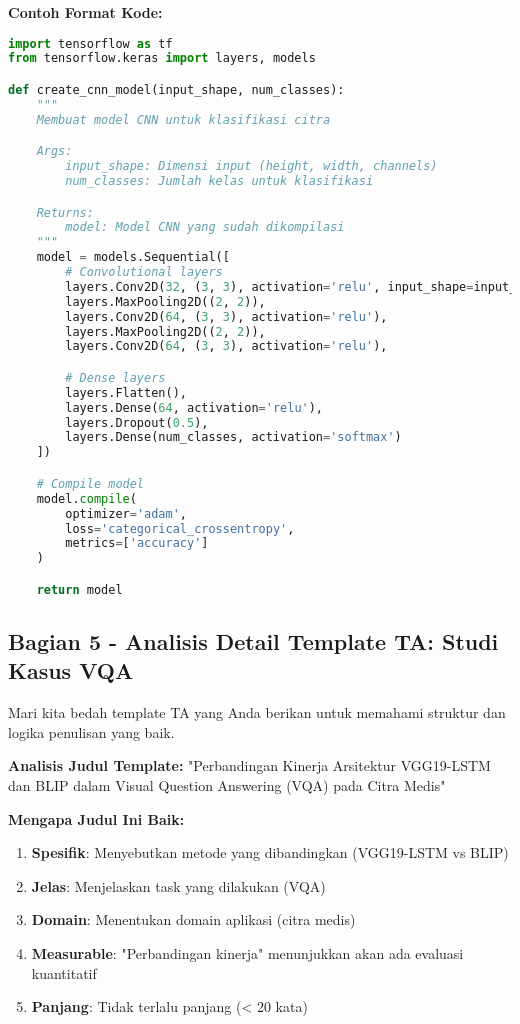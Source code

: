 \textbf{Contoh Format Kode:}
\begin{lstlisting}[language=python, style=python, caption=Implementasi Model CNN untuk Klasifikasi Citra]
import tensorflow as tf
from tensorflow.keras import layers, models

def create_cnn_model(input_shape, num_classes):
    """
    Membuat model CNN untuk klasifikasi citra

    Args:
        input_shape: Dimensi input (height, width, channels)
        num_classes: Jumlah kelas untuk klasifikasi

    Returns:
        model: Model CNN yang sudah dikompilasi
    """
    model = models.Sequential([
        # Convolutional layers
        layers.Conv2D(32, (3, 3), activation='relu', input_shape=input_shape),
        layers.MaxPooling2D((2, 2)),
        layers.Conv2D(64, (3, 3), activation='relu'),
        layers.MaxPooling2D((2, 2)),
        layers.Conv2D(64, (3, 3), activation='relu'),

        # Dense layers
        layers.Flatten(),
        layers.Dense(64, activation='relu'),
        layers.Dropout(0.5),
        layers.Dense(num_classes, activation='softmax')
    ])

    # Compile model
    model.compile(
        optimizer='adam',
        loss='categorical_crossentropy',
        metrics=['accuracy']
    )

    return model
\end{lstlisting}

\subsection*{Bagian 5 - Analisis Detail Template TA: Studi Kasus VQA}

Mari kita bedah template TA yang Anda berikan untuk memahami struktur dan logika penulisan yang baik.

\textbf{Analisis Judul Template:}
"Perbandingan Kinerja Arsitektur VGG19-LSTM dan BLIP dalam Visual Question Answering (VQA) pada Citra Medis"

\textbf{Mengapa Judul Ini Baik:}
\begin{enumerate}
    \item \textbf{Spesifik}: Menyebutkan metode yang dibandingkan (VGG19-LSTM vs BLIP)
    \item \textbf{Jelas}: Menjelaskan task yang dilakukan (VQA)
    \item \textbf{Domain}: Menentukan domain aplikasi (citra medis)
    \item \textbf{Measurable}: "Perbandingan kinerja" menunjukkan akan ada evaluasi kuantitatif
    \item \textbf{Panjang}: Tidak terlalu panjang (< 20 kata)
\end{enumerate}

